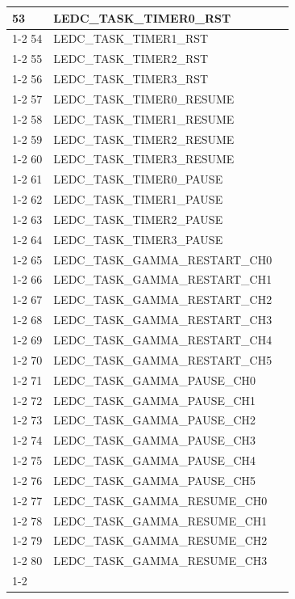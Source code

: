 \documentclass[main\_\_EN.tex]{subfiles}
\begin{document}
\begin{longtable}{ | l | l | l | }
53  & LEDC\_TASK\_TIMER0\_RST  & \\ \cline{1-2}
54  & LEDC\_TASK\_TIMER1\_RST  & \\ \cline{1-2}
55  & LEDC\_TASK\_TIMER2\_RST  & \\ \cline{1-2}
56  & LEDC\_TASK\_TIMER3\_RST  & \\ \cline{1-2}
57  & LEDC\_TASK\_TIMER0\_RESUME    & \\ \cline{1-2}
58  & LEDC\_TASK\_TIMER1\_RESUME    & \\ \cline{1-2}
59  & LEDC\_TASK\_TIMER2\_RESUME    & \\ \cline{1-2}
60  & LEDC\_TASK\_TIMER3\_RESUME    & \\ \cline{1-2}
61  & LEDC\_TASK\_TIMER0\_PAUSE& \\ \cline{1-2}
62  & LEDC\_TASK\_TIMER1\_PAUSE& \\ \cline{1-2}
63  & LEDC\_TASK\_TIMER2\_PAUSE& \\ \cline{1-2}
64  & LEDC\_TASK\_TIMER3\_PAUSE& \\ \cline{1-2}
65  & LEDC\_TASK\_GAMMA\_RESTART\_CH0      & \\ \cline{1-2}
66  & LEDC\_TASK\_GAMMA\_RESTART\_CH1      & \\ \cline{1-2}
67  & LEDC\_TASK\_GAMMA\_RESTART\_CH2      & \\ \cline{1-2}
68  & LEDC\_TASK\_GAMMA\_RESTART\_CH3      & \\ \cline{1-2}
69  & LEDC\_TASK\_GAMMA\_RESTART\_CH4      & \\ \cline{1-2}
70  & LEDC\_TASK\_GAMMA\_RESTART\_CH5      & \\ \cline{1-2}
71  & LEDC\_TASK\_GAMMA\_PAUSE\_CH0 & \\ \cline{1-2}
72  & LEDC\_TASK\_GAMMA\_PAUSE\_CH1 & \\ \cline{1-2}
73  & LEDC\_TASK\_GAMMA\_PAUSE\_CH2 & \\ \cline{1-2}
74  & LEDC\_TASK\_GAMMA\_PAUSE\_CH3 & \\ \cline{1-2}
75  & LEDC\_TASK\_GAMMA\_PAUSE\_CH4 & \\ \cline{1-2}
76  & LEDC\_TASK\_GAMMA\_PAUSE\_CH5 & \\ \cline{1-2}
77  & LEDC\_TASK\_GAMMA\_RESUME\_CH0& \\ \cline{1-2}
78  & LEDC\_TASK\_GAMMA\_RESUME\_CH1& \\ \cline{1-2}
79  & LEDC\_TASK\_GAMMA\_RESUME\_CH2& \\ \cline{1-2}
80  & LEDC\_TASK\_GAMMA\_RESUME\_CH3& \\ \cline{1-2}

\end{longtable}
\end{document}
